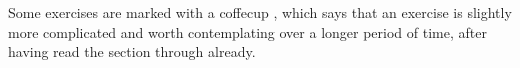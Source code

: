 \documentclass[../book.tex]{subfiles}
\begin{document}
Some exercises are marked with a coffecup \dolater, 
which says that an exercise is slightly more complicated 
and worth contemplating over a longer period of time,
after having read the section through already.
\end{document}
